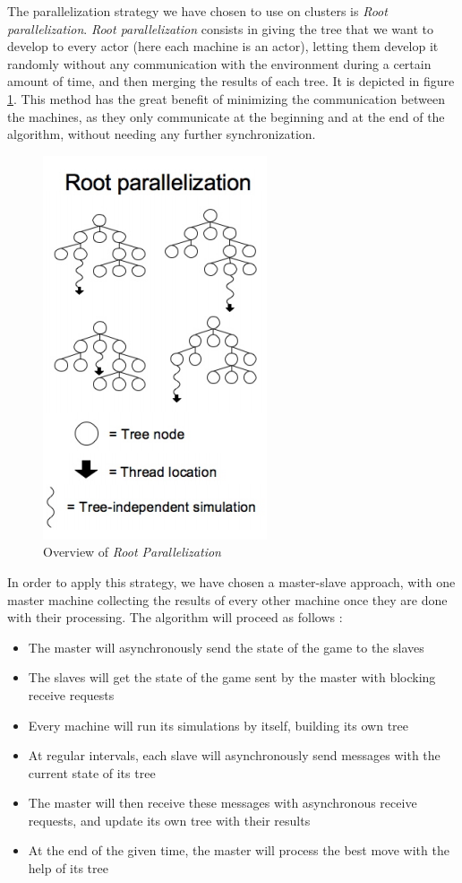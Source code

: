 The parallelization strategy we have chosen to use on clusters is \emph{Root parallelization}.
\emph{Root parallelization} consists in giving the tree that we want to develop to every actor (here each machine is an actor), letting them develop it randomly without any communication with the environment during a certain amount of time, and then merging the results of each tree.
It is depicted in figure \ref{fig:root}.
This method has the great benefit of minimizing the communication between the machines, as they only communicate at the beginning and at the end of the algorithm, without needing any further synchronization.

\begin{figure}[!ht] 
\centerline{\includegraphics[scale=0.5]{Parallelisation/Strategy/Img/root.png}}
   \caption{Overview of \emph{Root Parallelization} \cite{parallel_comp}}
\label{fig:root}
\end{figure}

In order to apply this strategy, we have chosen a master-slave approach, with one master machine collecting the results of every other machine once they are done with their processing.
The algorithm will proceed as follows :
\begin{itemize}
	\item The master will asynchronously send the state of the game to the slaves
	\item The slaves will get the state of the game sent by the master with blocking receive requests
	\item Every machine will run its simulations by itself, building its own tree
	\item At regular intervals, each slave will asynchronously send messages with the current state of its tree
	\item The master will then receive these messages with asynchronous receive requests, and update its own tree with their results
	\item At the end of the given time, the master will process the best move with the help of its tree
\end{itemize}

